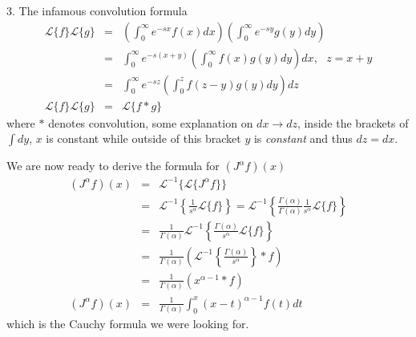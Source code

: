 \documentclass[aps,preprint,preprintnumbers,nofootinbib,showpacs,prd]{revtex4-1}
\newcommand{\nbea}{\begin{eqnarray*}}
\newcommand{\neea}{\end{eqnarray*}}
\begin{document}
3. The infamous convolution formula 
\nbea
\mathcal{L}\{f\}\mathcal{L}\{g\} & = & \left (\int_0^\infty e^{-sx} f(x) dx\right )\left (\int_0^\infty e^{-sy} g(y) dy\right ) \\
& = & \int_0^\infty e^{-s(x+y)}  \left ( \int_0^{\infty} f(x) g(y) dy \right ) dx, ~~~ z = x + y \\
& = & \int_0^\infty e^{-s z} \left ( \int_0^{z} f(z-y) g(y) dy \right ) dz \\
\mathcal{L}\{f\}\mathcal{L}\{g\} & = & \mathcal{L} \{ f * g\}
\neea
where $*$ denotes convolution, some explanation on $dx \rightarrow dz$, inside the brackets of $\int dy$, $x$ is constant while outside of this bracket $y$ is {\it constant} and thus $dz = dx$.
 
We are now ready to derive the formula for $(J^\alpha f)(x)$
\nbea
(J^\alpha f)(x) & = & \mathcal{L}^{-1} \{ \mathcal{L} \{J^\alpha f\} \} \\
& = & \mathcal{L}^{-1} \left \{ \frac{1}{s^\alpha} \mathcal{L} \{ f\} \right \} = \mathcal{L}^{-1} \left \{ \frac{\Gamma(\alpha)}{\Gamma(\alpha)}\frac{1}{s^\alpha} \mathcal{L} \{ f\} \right \} \\
& = & \frac{1}{\Gamma(\alpha)}\mathcal{L}^{-1} \left \{ \frac{\Gamma(\alpha)}{s^\alpha} \mathcal{L} \{ f\} \right \} \\
& = & \frac{1}{\Gamma(\alpha)} \left ( \mathcal{L}^{-1} \left \{ \frac{\Gamma(\alpha)}{s^\alpha} \right \} *  f \right ) \\
& = & \frac{1}{\Gamma(\alpha)} \left ( x^{\alpha-1} *  f \right ) \\
(J^\alpha f)(x) & = & \frac{1}{\Gamma(\alpha)} \int_0^x ( x - t )^{\alpha-1}  f(t) dt 
\neea
which is the Cauchy formula we were looking for.
\end{document}
